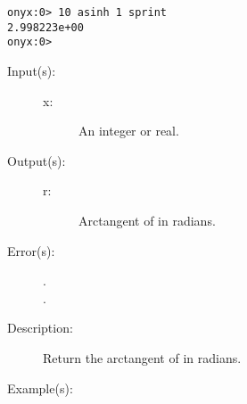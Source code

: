 \begin{description}
\begin{description}
\begin{verbatim}
onyx:0> 10 asinh 1 sprint
2.998223e+00
onyx:0>
		\end{verbatim}
	\end{description}
\label{systemdict:atan}
\item[{\onyxop{x}{atan}{r}}: ]
	\begin{description}\item[]
	\item[Input(s): ]
		\begin{description}\item[]
		\item[x: ]
			An integer or real.
		\end{description}
	\item[Output(s): ]
		\begin{description}\item[]
		\item[r: ]
			Arctangent of  in radians.
		\end{description}
	\item[Error(s): ]
		\begin{description}\item[]
		\item[.]
		\item[.]
		\end{description}
	\item[Description: ]
		Return the arctangent of  in radians.
	\item[Example(s): ]\begin{verbatim}


\end{verbatim}
\end{description}
\end{description}

